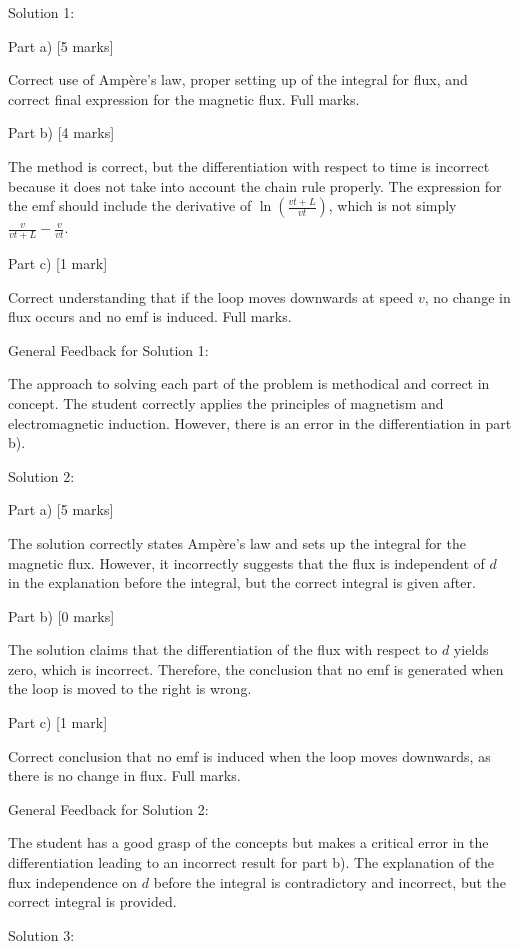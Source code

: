 \documentclass[a4paper,11pt]{article}
\begin{document}
Solution 1:

Part a) [5 marks]

Correct use of Amp\`ere's law, proper setting up of the integral for flux, and correct final expression for the magnetic flux. Full marks.

Part b) [4 marks]

The method is correct, but the differentiation with respect to time is incorrect because it does not take into account the chain rule properly. The expression for the emf should include the derivative of \( \ln\left(\frac{vt+L}{vt}\right) \), which is not simply \( \frac{v}{vt+L} - \frac{v}{vt} \).

Part c) [1 mark]

Correct understanding that if the loop moves downwards at speed \( v \), no change in flux occurs and no emf is induced. Full marks.

General Feedback for Solution 1:

The approach to solving each part of the problem is methodical and correct in concept. The student correctly applies the principles of magnetism and electromagnetic induction. However, there is an error in the differentiation in part b).

Solution 2:

Part a) [5 marks]

The solution correctly states Amp\`ere's law and sets up the integral for the magnetic flux. However, it incorrectly suggests that the flux is independent of \( d \) in the explanation before the integral, but the correct integral is given after.

Part b) [0 marks]

The solution claims that the differentiation of the flux with respect to \( d \) yields zero, which is incorrect. Therefore, the conclusion that no emf is generated when the loop is moved to the right is wrong.

Part c) [1 mark]

Correct conclusion that no emf is induced when the loop moves downwards, as there is no change in flux. Full marks.

General Feedback for Solution 2:

The student has a good grasp of the concepts but makes a critical error in the differentiation leading to an incorrect result for part b). The explanation of the flux independence on \( d \) before the integral is contradictory and incorrect, but the correct integral is provided.

Solution 3:
\end{document}
